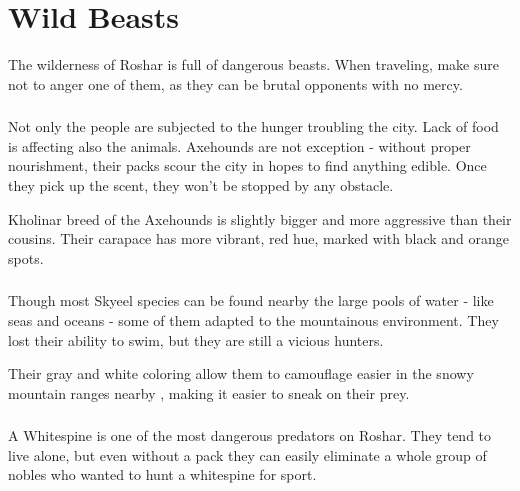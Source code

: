 \section{Wild Beasts}
\label{enemyFractionBeasts}

The wilderness of Roshar is full of dangerous beasts. When traveling, make sure not to anger one of them, as they can be brutal opponents with no mercy.

\subsubsection{\enemyAxehoundName}

Not only the people are subjected to the hunger troubling the city. Lack of food is affecting also the animals. Axehounds are not exception - without proper nourishment, their packs scour the city in hopes to find anything edible. Once they pick up the scent, they won't be stopped by any obstacle.

Kholinar breed of the Axehounds is slightly bigger and more aggressive than their cousins. Their carapace has more vibrant, red hue, marked with black and orange spots.


\subsubsection{\enemySkyeelName}

Though most Skyeel species can be found nearby the large pools of water - like seas and oceans - some of them adapted to the mountainous environment. They lost their ability to swim, but they are still a vicious hunters.

Their gray and white coloring allow them to camouflage easier in the snowy mountain ranges nearby \locationUrithiru{}, making it easier to sneak on their prey.


\subsubsection{\enemyWhitespineName}

A Whitespine is one of the most dangerous predators on Roshar. They tend to live alone, but even without a pack they can easily eliminate a whole group of nobles who wanted to hunt a whitespine for sport.

\newpage

\newpage

\newpage

